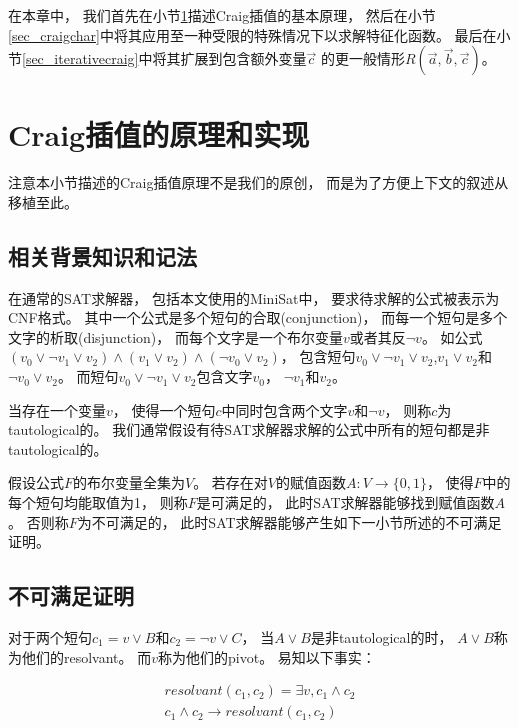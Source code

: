 在本章中，
我们首先在小节\ref{sec_craigimp}描述Craig插值的基本原理，
然后在小节\ref{sec_craigchar}中将其应用至一种受限的特殊情况下以求解特征化函数。
最后在小节\ref{sec_iterativecraig}中将其扩展到包含额外变量$\vec{c}$ 的更一般情形$R(\vec{a},\vec{b},\vec{c})$。

\section{Craig插值的原理和实现}\label{sec_craigimp}
注意本小节描述的Craig插值原理不是我们的原创，
而是为了方便上下文的叙述从 移植至此。
\subsection{相关背景知识和记法}
在通常的SAT求解器，
包括本文使用的MiniSat中，
要求待求解的公式被表示为CNF格式。
其中一个公式是多个短句的合取(conjunction)，
而每一个短句是多个文字的析取(disjunction)，
而每个文字是一个布尔变量$v$或者其反$\neg v$。
如公式$(v_0\vee\neg v_1\vee v_2)\wedge(v_1\vee v_2)\wedge(\neg v_0\vee v_2)$，
包含短句$v_0\vee\neg v_1\vee v_2$,$v_1\vee v_2$和$\neg v_0\vee v_2$。
而短句$v_0\vee\neg v_1\vee v_2$包含文字$v_0$， $\neg v_1$和$v_2$。

当存在一个变量$v$，
使得一个短句$c$中同时包含两个文字$v$和$\neg v$，
则称$c$为tautological的。
我们通常假设有待SAT求解器求解的公式中所有的短句都是非tautological的。

假设公式$F$的布尔变量全集为$V$。
若存在对$V$的赋值函数$A:V\to \{0,1\}$，
使得$F$中的每个短句均能取值为1，
则称$F$是可满足的，
此时SAT求解器能够找到赋值函数$A$。
否则称$F$为不可满足的，
此时SAT求解器能够产生如下一小节所述的不可满足证明。

\subsection{不可满足证明}
对于两个短句$c_1=v\vee B$和$c_2=\neg v\vee C$，
当$A\vee B$是非tautological的时，
$A\vee B$称为他们的resolvant。
而$v$称为他们的pivot。
易知以下事实：

\begin{equation}
\begin{array}{ccc}
&resolvant(c_1,c_2) = \exists v, c_1\wedge c_2 &\\
&c_1\wedge c_2 \to resolvant(c_1,c_2)&
\end{array}
\end{equation}

